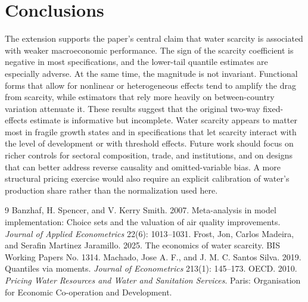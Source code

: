 \documentclass[11pt]{article}
\begin{document}
\section{Conclusions}
The extension supports the paper's central claim that water scarcity is associated with weaker macroeconomic performance. The sign of the scarcity coefficient is negative in most specifications, and the lower-tail quantile estimates are especially adverse. At the same time, the magnitude is not invariant. Functional forms that allow for nonlinear or heterogeneous effects tend to amplify the drag from scarcity, while estimators that rely more heavily on between-country variation attenuate it.
These results suggest that the original two-way fixed-effects estimate is informative but incomplete. Water scarcity appears to matter most in fragile growth states and in specifications that let scarcity interact with the level of development or with threshold effects. Future work should focus on richer controls for sectoral composition, trade, and institutions, and on designs that can better address reverse causality and omitted-variable bias. A more structural pricing exercise would also require an explicit calibration of water's production share rather than the normalization used here.
\begin{thebibliography}{9}
 Banzhaf, H. Spencer, and V. Kerry Smith. 2007. Meta-analysis in model implementation: Choice sets and the valuation of air quality improvements. \textit{Journal of Applied Econometrics} 22(6): 1013--1031.
 Frost, Jon, Carlos Madeira, and Serafin Martinez Jaramillo. 2025. The economics of water scarcity. BIS Working Papers No. 1314.
 Machado, Jose A. F., and J. M. C. Santos Silva. 2019. Quantiles via moments. \textit{Journal of Econometrics} 213(1): 145--173.
 OECD. 2010. \textit{Pricing Water Resources and Water and Sanitation Services}. Paris: Organisation for Economic Co-operation and Development.
\end{thebibliography}
\end{document}
